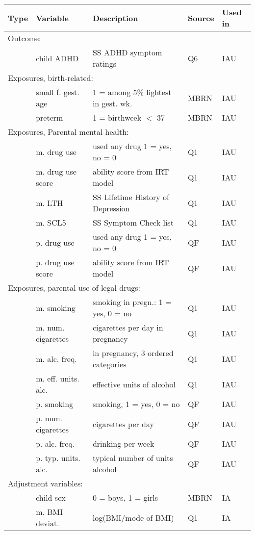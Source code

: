 \documentclass[a4paper]{article}
\begin{document}
	\begin{table}
		\begin{tabular}{lllll}
			\hline
			Type & Variable & Description & Source & Used in\\ 
			\hline
			\multicolumn{5}{l}{Outcome:} \\
			& child ADHD & SS ADHD symptom ratings & Q6 & IAU\\ 
			\multicolumn{5}{l}{Exposures, birth-related:} \\
			& small f. gest. age & 1 = among 5\% lightest in gest. wk. & MBRN & IAU\\ 
			& preterm & 1 = birthweek $<$ 37 & MBRN & IAU\\ 
			\multicolumn{5}{l}{Exposures, Parental mental health:} \\
			& m. drug use & used any drug 1 = yes, no = 0 & Q1 & IAU\\ 
			& m. drug use score & ability score from IRT model & Q1 & IAU\\ 
			& m. LTH & SS Lifetime History of Depression & Q1 & IAU\\ 
			& m. SCL5 & SS Symptom Check list & Q1 & IAU\\ 
			& p. drug use & used any drug 1 = yes, no = 0 & QF & IAU\\ 
			& p. drug use score & ability score from IRT model & QF & IAU\\ 
			\multicolumn{5}{l}{Exposures, parental use of legal drugs:} \\
			& m. smoking & smoking in pregn.: 1 = yes, 0 = no & Q1 & IAU\\ 
			& m. num. cigarettes & cigarettes per day in pregnancy & Q1 & IAU\\ 
			& m. alc. freq. & in pregnancy, 3 ordered categories & Q1 & IAU\\ 
			& m. eff. units. alc. & effective units of alcohol & Q1 & IAU\\ 
			& p. smoking & smoking, 1 = yes, 0 = no & QF & IAU\\ 
			& p. num. cigarettes & cigarettes per day & QF & IAU\\ 
			& p. alc. freq. & drinking per week & QF & IAU\\ 
			& p. typ. units. alc. & typical number of units alcohol  & QF & IAU\\
			\multicolumn{5}{l}{Adjustment variables:} \\ 
			& child sex & 0 = boys, 1 = girls & MBRN & IA\\ 
			& m. BMI deviat. & log(BMI/mode of BMI) & Q1 & IA \\ 

\end{tabular}
\end{table}
\end{document}
